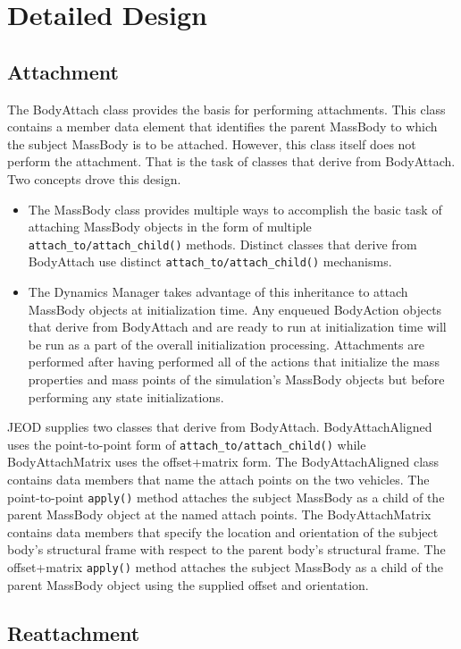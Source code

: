 \section{Detailed Design}

\subsection{Attachment}
The \ModelDesc BodyAttach class provides the basis for performing
attachments. This class contains a member
data element that identifies the parent MassBody to which the subject
MassBody is to be attached.
However, this class itself does not perform the
attachment. That is the task of classes that derive from BodyAttach.
Two concepts drove this design.
\begin{itemize}
\item The MassBody class provides multiple ways to accomplish the basic task of
  attaching MassBody objects in the form of multiple {\tt attach\_to/attach\_child()} methods.
  Distinct classes that derive from BodyAttach use distinct
  {\tt attach\_to/attach\_child()} mechanisms.
\item The Dynamics Manager takes advantage of this inheritance to attach
  MassBody objects at initialization time. Any enqueued BodyAction objects
  that derive from BodyAttach and are ready to run at initialization
  time will be run as a part of the overall initialization processing.
  Attachments are performed after having performed all of the actions
  that initialize the mass properties and mass points of the simulation's
  MassBody objects but before performing any state initializations.
\end{itemize}

JEOD supplies two classes that derive from BodyAttach.
BodyAttachAligned uses the point-to-point form of {\tt attach\_to/attach\_child()}
while BodyAttachMatrix uses the offset+matrix form.
The BodyAttachAligned class contains data members that name the
attach points on the two vehicles.
The point-to-point {\tt apply()} method attaches the
subject MassBody as a child of the parent MassBody object at the named
attach points.
The BodyAttachMatrix contains data members that specify the location
and orientation of the subject body's structural frame with respect to
the parent body's structural frame. The offset+matrix {\tt apply()} method
attaches the subject MassBody as a child of the parent MassBody object
using the supplied offset and orientation.

\subsection{Reattachment}

